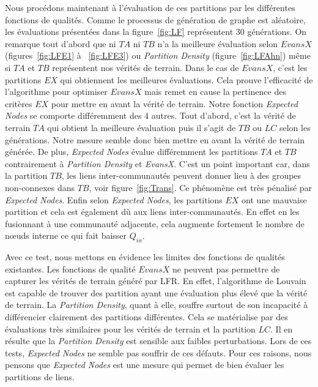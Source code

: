 Nous procédons maintenant à l'évaluation de ces partitions par les différentes fonctions de qualités.
Comme le processus de génération de graphe est aléatoire, les évaluations présentées dans la figure~\ref{fig:LF} représentent $30$ générations.
On remarque tout d'abord que ni $TA$ ni $TB$ n'a la meilleure évaluation selon $EvansX$ (figures~\ref{fig:LFE1} à ~\ref{fig:LFE3}) ou \emph{Partition Density} (figure~\ref{fig:LFAhn}) même si $TA$ et $TB$ représentent nos vérités de terrain.
Dans le cas de $EvansX$, c'est les partitions $EX$ qui obtiennent les meilleures évaluations.
Cela prouve l'efficacité de l'algorithme pour optimiser $EvansX$ mais remet en cause la pertinence des critères $EX$ pour mettre en avant la vérité de terrain.
Notre fonction \emph{Expected Nodes} se comporte différemment des 4 autres.
Tout d'abord, c'est la vérité de terrain $TA$ qui obtient la meilleure évaluation puis il s'agit de $TB$ ou $LC$ selon les générations.
Notre mesure semble donc bien mettre en avant la vérité de terrain générée.
De plus, \emph{Expected Nodes} évalue différemment les partitions $TA$ et $TB$ contrairement à \emph{Partition Density} et \emph{EvansX}.
C'est un point important car, dans la partition $TB$, les liens inter-communautés peuvent donner lieu à des groupes non-connexes dans $TB$, voir figure~\ref{fig:Trans}.
Ce phénomène est très pénalisé par \emph{Expected Nodes}.
Enfin selon \emph{Expected Nodes}, les partitions $EX$ ont une mauvaise partition et cela est également dù aux liens inter-communautés.
En effet en les fusionnant à une communauté adjacente, cela augmente fortement le nombre de n\oe uds interne ce qui fait baisser $Q_{in}$.

Avec ce test, nous mettons en évidence les limites des fonctions de qualités existantes.
Les fonctions de qualité $EvansX$ ne peuvent pas permettre de capturer les vérités de terrain généré par LFR.
En effet, l'algorithme de Louvain est capable de trouver des partition ayant une évaluation plus élevé que la vérité de terrain.
La \emph{Partition Density}, quant à elle, souffre surtout de son incapacité à différencier clairement des partitions différentes.
Cela se matérialise par des évaluations très similaires pour les vérités de terrain et la partition $LC$.
Il en résulte que la \emph{Partition Density} est sensible aux faibles perturbations.
Lors de ces tests, \emph{Expected Nodes} ne semble pas souffrir de ces défauts.
Pour ces raisons, nous pensons que \emph{Expected Nodes} est une mesure qui permet de bien évaluer les partitions de liens.

